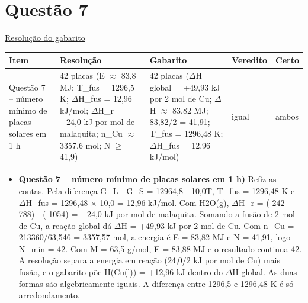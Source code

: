 \documentclass{article}%
\begin{document}
\section*{Questão 7}%
\href{https://poliedroresolve.sistemapoliedro.com.br/vestibulares/ime/2026/ime-2-fase-dia-3-25-10-2025-2-fase-dia-3/dissertativa-7-quimica-2-fase-dia-3-ime-2026}{Resolução do gabarito}\par\smallskip%
\begin{longtable}{@{}p{} p{} p{} p{} p{}@{}}\toprule Item & Resolução & Gabarito & Veredito & Certo \\ \midrule
Questão 7 -- número mínimo de placas solares em 1 h & 42 placas (E $\approx$ 83,8 MJ; T\_fus = 1296,5 K; $\Delta$H\_fus = 12,96 kJ/mol; $\Delta$H\_r = +24,0 kJ por mol de malaquita; n\_Cu $\approx$ 3357,6 mol; N $\geq$ 41,9) & 42 placas ($\Delta$H global = +49,93 kJ por 2 mol de Cu; $\Delta$H $\approx$ 83,82 MJ; 83,82/2 = 41,91; T\_fus = 1296,48 K; $\Delta$H\_fus = 12,96 kJ/mol) & igual & ambos \\
\bottomrule\end{longtable}%
\begin{itemize}%
\item%
\textbf{Questão 7 -- número mínimo de placas solares em 1 h)} Refiz as contas. Pela diferença G\_L - G\_S = 12964,8 - 10,0T, T\_fus = 1296,48 K e $\Delta$H\_fus = 1296,48 $\times$ 10,0 = 12,96 kJ/mol. Com H2O(g), $\Delta$H\_r = (-242 - 788) - (-1054) = +24,0 kJ por mol de malaquita. Somando a fusão de 2 mol de Cu, a reação global dá $\Delta$H = +49,93 kJ por 2 mol de Cu. Com n\_Cu = 213360/63,546 = 3357,57 mol, a energia é E = 83,82 MJ e N = 41,91, logo N\_min = 42. Com M = 63,5 g/mol, E = 83,88 MJ e o resultado continua 42. A resolução separa a energia em reação (24,0/2 kJ por mol de Cu) mais fusão, e o gabarito põe H(Cu(l)) = +12,96 kJ dentro do $\Delta$H global. As duas formas são algebricamente iguais. A diferença entre 1296,5 e 1296,48 K é só arredondamento.%
\end{itemize}%
\end{document}
